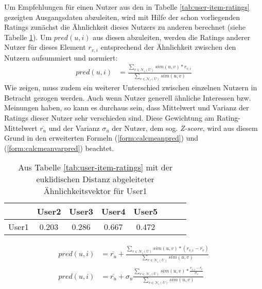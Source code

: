 Um Empfehlungen für einen Nutzer aus den in Tabelle \ref{tab:user-item-ratings} gezeigten Ausgangsdaten abzuleiten, wird mit Hilfe der schon vorliegenden Ratings zunächst die Ähnlichkeit dieses Nutzers zu anderen berechnet (siehe Tabelle \ref{tab:user-user-sim}). Um $pred(u,i)$ aus diesen abzuleiten, werden die Ratings anderer Nutzer für dieses Element $r_{v,i}$ entsprechend der Ähnlichkeit zwischen den Nutzern aufsummiert und normiert:
\begin{align}
pred(u,i) & = \frac{ \sum_{v \in \mathcal{N}_i(U)} sim(u, v)*r_{v,i}}{ \sum_{v \in \mathcal{N}_i(U)} sim(u,v) } \label{form:calcpred}
\end{align}
Wie \citep{Herlocker:2002:EAD:593967.594047} zeigen, muss zudem ein weiterer Unterschied zwischen einzelnen Nutzern in Betracht gezogen werden. Auch wenn Nutzer generell ähnliche Interessen bzw. Meinungen haben, so kann es durchaus sein, dass Mittelwert und Varianz der Ratings dieser Nutzer sehr verschieden sind. Diese Gewichtung am Rating-Mittelwert $\overline{r_u}$ und der Varianz  $\sigma_u$ der Nutzer, dem sog. \textit{Z-score}, wird aus diesem Grund in den erweiterten Formeln (\ref{form:calcmeanpred}) und (\ref{form:calcmeanvarpred}) beachtet. \citep{hb_04,Huete:2012:UPA:2206442.2206675} 
\begin{table}
  \centering
  \begin{tabular}{ | l || c | c | c | c | c | c | c | }
    \hline
           & User2 & User3 & User4 & User5 \\ \hline
User1 &    0.203 &	0.286 &	0.667 & 0.472 \\	
    \hline
  \end{tabular}
  \caption{\footnotesize Aus Tabelle \ref{tab:user-item-ratings} mit der euklidischen Distanz abgeleiteter Ähnlichkeitsvektor für User1}
  \label{tab:user-user-sim}
\end{table}
\begin{align}
pred(u, i) & = \overline{r_u} + \frac{ \sum_{v \in \mathcal{N}_i(U)} sim(u, v)*(r_{v,i}-\overline{r_v}) } { \sum_{v \in \mathcal{N}_i(U)} sim(u,v) } \label{form:calcmeanpred} \\
pred(u, i) & = \overline{r_u} + \sigma_u \frac{ \sum_{v \in \mathcal{N}_i(U)} sim(u, v)*\frac{r_{v,i}-\overline{r_v}}{\sigma_v} } { \sum_{v \in \mathcal{N}_i(U)} sim(u,v) } \label{form:calcmeanvarpred}
\end{align}


